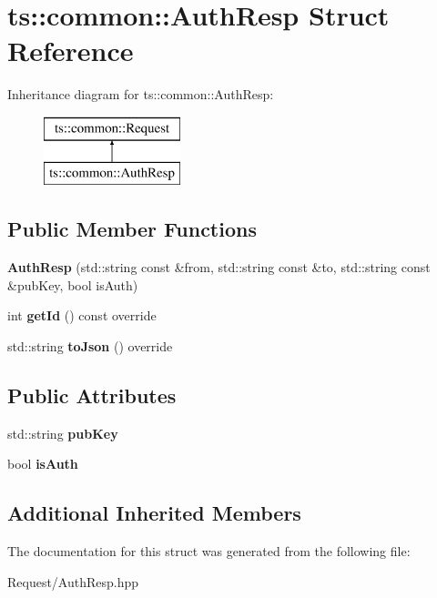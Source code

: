 \hypertarget{structts_1_1common_1_1_auth_resp}{}\section{ts\+:\+:common\+:\+:Auth\+Resp Struct Reference}
\label{structts_1_1common_1_1_auth_resp}
Inheritance diagram for ts\+:\+:common\+:\+:Auth\+Resp\+:\begin{figure}[H]
\begin{center}
\leavevmode
\includegraphics[height=2.000000cm]{structts_1_1common_1_1_auth_resp}
\end{center}
\end{figure}
\subsection*{Public Member Functions}
\begin{DoxyCompactItemize}
\item 
\mbox{\label{structts_1_1common_1_1_auth_resp_a6e21274493a765e77ec01e8fc2fb7f50}} 
{\bfseries Auth\+Resp} (std\+::string const \&from, std\+::string const \&to, std\+::string const \&pub\+Key, bool is\+Auth)
\item 
\mbox{\label{structts_1_1common_1_1_auth_resp_ad657f20221ab1c81533cabdd7088a951}} 
int {\bfseries get\+Id} () const override
\item 
\mbox{\label{structts_1_1common_1_1_auth_resp_a200cf43981dbe5e19d4504f1c9e64faf}} 
std\+::string {\bfseries to\+Json} () override
\end{DoxyCompactItemize}
\subsection*{Public Attributes}
\begin{DoxyCompactItemize}
\item 
\mbox{\label{structts_1_1common_1_1_auth_resp_abba0baaf574b6ceb08c8bbe41f9bd122}} 
std\+::string {\bfseries pub\+Key}
\item 
\mbox{\label{structts_1_1common_1_1_auth_resp_a1ce64ac646961e594a16fca9eb596be8}} 
bool {\bfseries is\+Auth}
\end{DoxyCompactItemize}
\subsection*{Additional Inherited Members}


The documentation for this struct was generated from the following file\+:\begin{DoxyCompactItemize}
\item 
Request/Auth\+Resp.\+hpp\end{DoxyCompactItemize}
